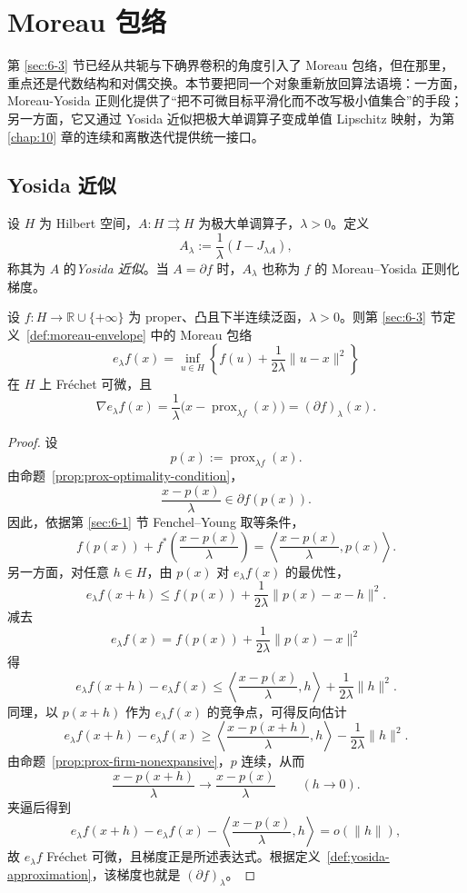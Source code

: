 \section{Moreau 包络}

\label{sec:9-3}

第 \ref{sec:6-3} 节已经从共轭与下确界卷积的角度引入了 Moreau 包络，但在那里，重点还是代数结构和对偶交换。本节要把同一个对象重新放回算法语境：一方面，Moreau-Yosida 正则化提供了“把不可微目标平滑化而不改写极小值集合”的手段；另一方面，它又通过 Yosida 近似把极大单调算子变成单值 Lipschitz 映射，为第 \ref{chap:10} 章的连续和离散迭代提供统一接口。

\subsection{Yosida 近似}

\begin{definition}[Yosida 近似]\label{def:yosida-approximation}
设 $H$ 为 Hilbert 空间，$A\colon H\rightrightarrows H$ 为极大单调算子，$\lambda>0$。定义
\[
A_\lambda:=\frac{1}{\lambda}(I-J_{\lambda A}),
\]
称其为 $A$ 的\emph{Yosida 近似}。当 $A=\partial f$ 时，$A_\lambda$ 也称为 $f$ 的 Moreau--Yosida 正则化梯度。
\end{definition}

\begin{proposition}\label{prop:moreau-envelope-gradient}
设 $f\colon H\to \mathbb R\cup\{+\infty\}$ 为 proper、凸且下半连续泛函，$\lambda>0$。则第 \ref{sec:6-3} 节定义~\ref{def:moreau-envelope} 中的 Moreau 包络
\[
e_\lambda f(x)
=
\inf_{u\in H}
\left\{
f(u)+\frac{1}{2\lambda}\|u-x\|^2
\right\}
\]
在 $H$ 上 Fr\'echet 可微，且
\[
\nabla e_\lambda f(x)
=
\frac{1}{\lambda}\bigl(x-\operatorname{prox}_{\lambda f}(x)\bigr)
=(\partial f)_\lambda(x).
\]
\end{proposition}

\begin{proof}
设
\[
p(x):=\operatorname{prox}_{\lambda f}(x).
\]
由命题~\ref{prop:prox-optimality-condition}，
\[
\frac{x-p(x)}{\lambda}\in \partial f(p(x)).
\]
因此，依据第 \ref{sec:6-1} 节 Fenchel--Young 取等条件，
\[
f(p(x))+f^\ast\!\left(\frac{x-p(x)}{\lambda}\right)
=
\left\langle \frac{x-p(x)}{\lambda},p(x)\right\rangle.
\]
另一方面，对任意 $h\in H$，由 $p(x)$ 对 $e_\lambda f(x)$ 的最优性，
\[
e_\lambda f(x+h)
\le
f(p(x))+\frac{1}{2\lambda}\|p(x)-x-h\|^2.
\]
减去
\[
e_\lambda f(x)=f(p(x))+\frac{1}{2\lambda}\|p(x)-x\|^2
\]
得
\[
e_\lambda f(x+h)-e_\lambda f(x)
\le
\left\langle \frac{x-p(x)}{\lambda},h\right\rangle+\frac{1}{2\lambda}\|h\|^2.
\]
同理，以 $p(x+h)$ 作为 $e_\lambda f(x)$ 的竞争点，可得反向估计
\[
e_\lambda f(x+h)-e_\lambda f(x)
\ge
\left\langle \frac{x-p(x+h)}{\lambda},h\right\rangle-\frac{1}{2\lambda}\|h\|^2.
\]
由命题~\ref{prop:prox-firm-nonexpansive}，$p$ 连续，从而
\[
\frac{x-p(x+h)}{\lambda}\to \frac{x-p(x)}{\lambda}\qquad (h\to 0).
\]
夹逼后得到
\[
e_\lambda f(x+h)-e_\lambda f(x)-\left\langle \frac{x-p(x)}{\lambda},h\right\rangle=o(\|h\|),
\]
故 $e_\lambda f$ Fr\'echet 可微，且梯度正是所述表达式。根据定义~\ref{def:yosida-approximation}，该梯度也就是 $(\partial f)_\lambda$。
\end{proof}

